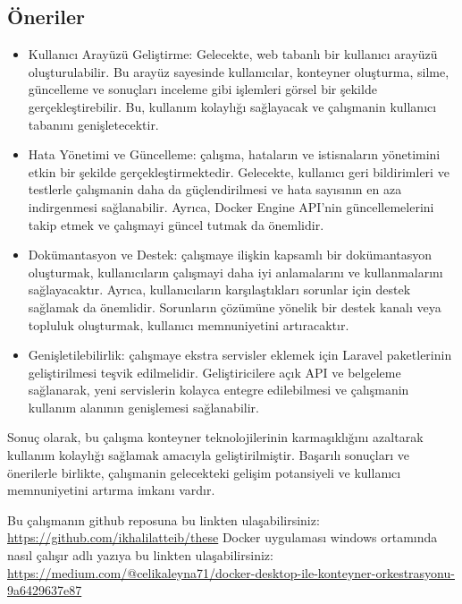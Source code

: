 \subsection*{Öneriler}
\begin{itemize}
    \item Kullanıcı Arayüzü Geliştirme: Gelecekte, web tabanlı bir kullanıcı arayüzü oluşturulabilir. Bu arayüz sayesinde kullanıcılar, konteyner oluşturma, silme, güncelleme ve sonuçları inceleme gibi işlemleri görsel bir şekilde gerçekleştirebilir. Bu, kullanım kolaylığı sağlayacak ve çalışmanin kullanıcı tabanını genişletecektir.
    \item Hata Yönetimi ve Güncelleme: çalışma, hataların ve istisnaların yönetimini etkin bir şekilde gerçekleştirmektedir. Gelecekte, kullanıcı geri bildirimleri ve testlerle çalışmanin daha da güçlendirilmesi ve hata sayısının en aza indirgenmesi sağlanabilir. Ayrıca, Docker Engine API'nin güncellemelerini takip etmek ve çalışmayi güncel tutmak da önemlidir.
    \item Dokümantasyon ve Destek: çalışmaye ilişkin kapsamlı bir dokümantasyon oluşturmak, kullanıcıların çalışmayi daha iyi anlamalarını ve kullanmalarını sağlayacaktır. Ayrıca, kullanıcıların karşılaştıkları sorunlar için destek sağlamak da önemlidir. Sorunların çözümüne yönelik bir destek kanalı veya topluluk oluşturmak, kullanıcı memnuniyetini artıracaktır.
    \item Genişletilebilirlik: çalışmaye ekstra servisler eklemek için Laravel paketlerinin geliştirilmesi teşvik edilmelidir. Geliştiricilere açık API ve belgeleme sağlanarak, yeni servislerin kolayca entegre edilebilmesi ve çalışmanin kullanım alanının genişlemesi sağlanabilir.
\end{itemize}

Sonuç olarak, bu çalışma konteyner teknolojilerinin karmaşıklığını azaltarak kullanım kolaylığı sağlamak amacıyla geliştirilmiştir. Başarılı sonuçları ve önerilerle birlikte, çalışmanin gelecekteki gelişim potansiyeli ve kullanıcı memnuniyetini artırma imkanı vardır.

Bu çalışmanın github reposuna bu linkten ulaşabilirsiniz: \href{https://github.com/ikhalilatteib/these}{https://github.com/ikhalilatteib/these}
Docker uygulaması windows ortamında nasıl çalışır adlı yazıya bu linkten ulaşabilirsiniz: \href{https://medium.com/@celikaleyna71/docker-desktop-ile-konteyner-orkestrasyonu-9a6429637e87}{https://medium.com/@celikaleyna71/docker-desktop-ile-konteyner-orkestrasyonu-9a6429637e87}